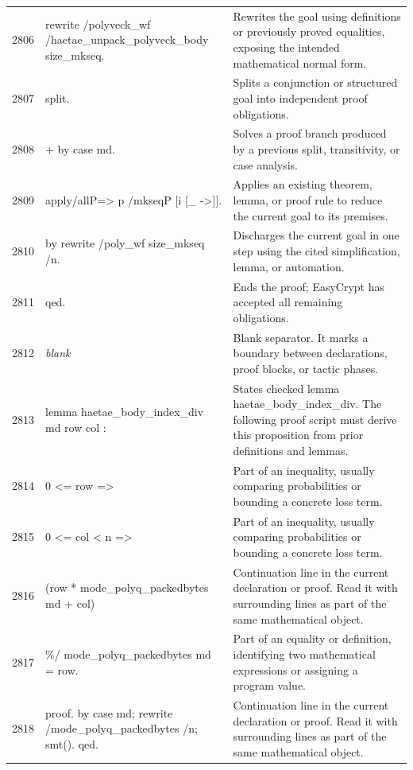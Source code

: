 \documentclass[10pt]{article}
\begin{document}
\begin{longtable}{r L{0.53\textwidth} L{0.37\textwidth}}
2806 & {\ttfamily\scriptsize rewrite /polyveck\_wf /haetae\_unpack\_polyveck\_body size\_mkseq.} & Rewrites the goal using definitions or previously proved equalities, exposing the intended mathematical normal form. \\
2807 & {\ttfamily\scriptsize split.} & Splits a conjunction or structured goal into independent proof obligations. \\
2808 & {\ttfamily\scriptsize + by case md.} & Solves a proof branch produced by a previous split, transitivity, or case analysis. \\
2809 & {\ttfamily\scriptsize apply/allP=> p /mkseqP [i [\_ ->]].} & Applies an existing theorem, lemma, or proof rule to reduce the current goal to its premises. \\
2810 & {\ttfamily\scriptsize by rewrite /poly\_wf size\_mkseq /n.} & Discharges the current goal in one step using the cited simplification, lemma, or automation. \\
2811 & {\ttfamily\scriptsize qed.} & Ends the proof; EasyCrypt has accepted all remaining obligations. \\
2812 & {\ttfamily\scriptsize \emph{blank}} & Blank separator.  It marks a boundary between declarations, proof blocks, or tactic phases. \\
2813 & {\ttfamily\scriptsize lemma haetae\_body\_index\_div md row col :} & States checked lemma haetae\_body\_index\_div.  The following proof script must derive this proposition from prior definitions and lemmas. \\
2814 & {\ttfamily\scriptsize   0 <= row =>} & Part of an inequality, usually comparing probabilities or bounding a concrete loss term. \\
2815 & {\ttfamily\scriptsize   0 <= col < n =>} & Part of an inequality, usually comparing probabilities or bounding a concrete loss term. \\
2816 & {\ttfamily\scriptsize   (row * mode\_polyq\_packedbytes md + col)} & Continuation line in the current declaration or proof.  Read it with surrounding lines as part of the same mathematical object. \\
2817 & {\ttfamily\scriptsize     \%/ mode\_polyq\_packedbytes md = row.} & Part of an equality or definition, identifying two mathematical expressions or assigning a program value. \\
2818 & {\ttfamily\scriptsize proof. by case md; rewrite /mode\_polyq\_packedbytes /n; smt(). qed.} & Continuation line in the current declaration or proof.  Read it with surrounding lines as part of the same mathematical object. \\

\end{longtable}
\end{document}
